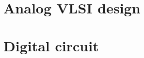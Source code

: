 \documentclass[UTF8]{book}
\begin{document}
	\begin{comment} 
	rather stupid, but helpful 
	\chapter{Transistor circuit analysis}
	\label{Transistor circuit analysis}
	\chapter{Transistor circuit design}
	\label{Transistor circuit design}
	\chapter{FET circuit analysis}
	\label{FET circuit analysis}
	\chapter{FET circuit design}
	\label{FET circuit design}
	\end{comment}
	
	\part{Analog VLSI design}
	\label{Analog VLSI design}
	
	
	\begin{comment} 
	rather stupid, but helpful 
	\chapter{Current source}
	\label{Current source}
	\chapter{Current mirror}
	\label{Current mirror }
	\chapter{Differential amplifier pair}
	\label{Differential amplifier pair}
	\chapter{OP AMP design}
	\label{OP AMP design}
	\end{comment}

	
	
	\part{Digital circuit}
	\label{Digital circuit}
	
\end{document}
